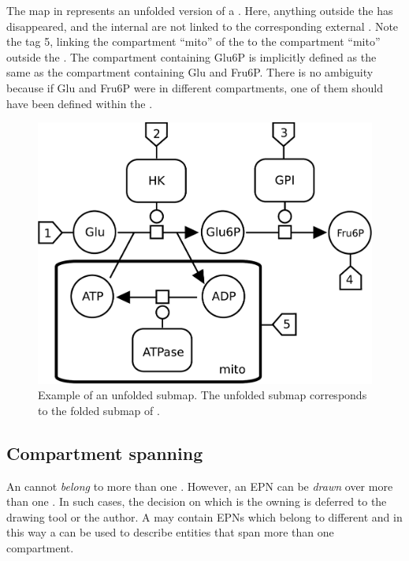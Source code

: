 The map in  represents an unfolded version of a
.  Here, anything outside the  has
disappeared, and the internal  are not linked to the
corresponding external .  Note the tag 5, linking the
compartment ``mito'' of the  to the compartment ``mito''
outside the .  The compartment containing Glu6P is
implicitly defined as the same as the compartment containing Glu and
Fru6P.  There is no ambiguity because if Glu and Fru6P were in
different compartments, one of them should have been defined within
the .

\begin{figure}[H]
  \centering
  \includegraphics[scale = 0.35]{examples/submap-dissociated}
  \caption{Example of an unfolded submap. The unfolded submap corresponds to the folded submap of .}
  \label{fig:submap-unfolded}
\end{figure}

\subsection{Compartment spanning}

An  cannot \emph{belong} to more than one
. However, an EPN can be \emph{drawn} over more than one
. In such cases, the decision on which is the owning
 is deferred to the drawing tool or the
author. A  may contain EPNs which belong to different
 and in this way a  can be used to describe
entities that span more than one {compartment}.

